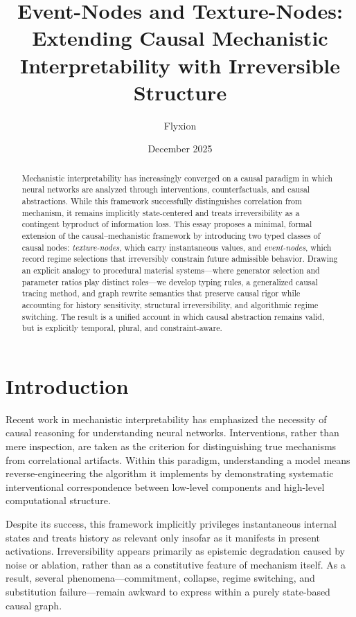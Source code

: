 \documentclass[11pt]{article}
\title{Event-Nodes and Texture-Nodes:\\
Extending Causal Mechanistic Interpretability with Irreversible Structure}
\author{Flyxion}
\date{December 2025}
\begin{document}
\maketitle

\begin{abstract}
Mechanistic interpretability has increasingly converged on a causal paradigm in
which neural networks are analyzed through interventions, counterfactuals, and
causal abstractions. While this framework successfully distinguishes correlation
from mechanism, it remains implicitly state-centered and treats irreversibility
as a contingent byproduct of information loss. This essay proposes a minimal,
formal extension of the causal–mechanistic framework by introducing two typed
classes of causal nodes: \emph{texture-nodes}, which carry instantaneous values,
and \emph{event-nodes}, which record regime selections that irreversibly constrain
future admissible behavior. Drawing an explicit analogy to procedural material
systems—where generator selection and parameter ratios play distinct roles—we
develop typing rules, a generalized causal tracing method, and graph rewrite
semantics that preserve causal rigor while accounting for history sensitivity,
structural irreversibility, and algorithmic regime switching. The result is a
unified account in which causal abstraction remains valid, but is explicitly
temporal, plural, and constraint-aware.
\end{abstract}

\section{Introduction}

Recent work in mechanistic interpretability has emphasized the necessity of
causal reasoning for understanding neural networks. Interventions, rather than
mere inspection, are taken as the criterion for distinguishing true mechanisms
from correlational artifacts. Within this paradigm, understanding a model means
reverse-engineering the algorithm it implements by demonstrating systematic
interventional correspondence between low-level components and high-level
computational structure.

Despite its success, this framework implicitly privileges instantaneous internal
states and treats history as relevant only insofar as it manifests in present
activations. Irreversibility appears primarily as epistemic degradation caused by
noise or ablation, rather than as a constitutive feature of mechanism itself. As
a result, several phenomena—commitment, collapse, regime switching, and
substitution failure—remain awkward to express within a purely state-based
causal graph.
\end{document}
